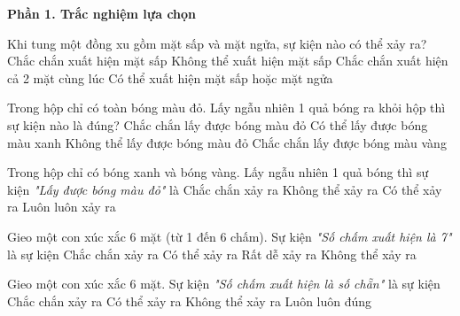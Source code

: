 \textbf{Phần 1. Trắc nghiệm lựa chọn}

\begin{ex} %
Khi tung một đồng xu gồm mặt sấp và mặt ngửa, sự kiện nào có thể xảy ra?
\choice
{Chắc chắn xuất hiện mặt sấp}
{Không thể xuất hiện mặt sấp}
{Chắc chắn xuất hiện cả 2 mặt cùng lúc}
{\True Có thể xuất hiện mặt sấp hoặc mặt ngửa}
\end{ex}

\begin{ex} %
Trong hộp chỉ có toàn bóng màu đỏ. Lấy ngẫu nhiên 1 quả bóng ra khỏi hộp thì sự kiện nào là đúng?
\choice
{\True Chắc chắn lấy được bóng màu đỏ}
{Có thể lấy được bóng màu xanh}
{Không thể lấy được bóng màu đỏ}
{Chắc chắn lấy được bóng màu vàng}
\end{ex}

\begin{ex} %
Trong hộp chỉ có bóng xanh và bóng vàng. Lấy ngẫu nhiên 1 quả bóng thì sự kiện \textit{"Lấy được bóng màu đỏ"} là
\choice
{Chắc chắn xảy ra}
{\True Không thể xảy ra}
{Có thể xảy ra}
{Luôn luôn xảy ra}
\end{ex}

\begin{ex} %
Gieo một con xúc xắc 6 mặt (từ 1 đến 6 chấm). Sự kiện \textit{"Số chấm xuất hiện là 7"} là sự kiện
\choice
{Chắc chắn xảy ra}
{Có thể xảy ra}
{Rất dễ xảy ra}
{\True Không thể xảy ra}
\end{ex}

\begin{ex} %
Gieo một con xúc xắc 6 mặt. Sự kiện \textit{"Số chấm xuất hiện là số chẵn"} là sự kiện
\choice
{Chắc chắn xảy ra}
{\True Có thể xảy ra}
{Không thể xảy ra}
{Luôn luôn đúng}
\end{ex}

